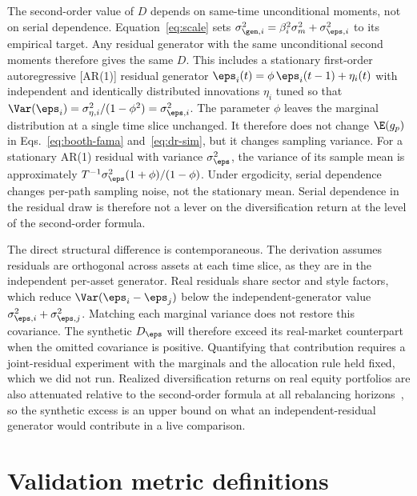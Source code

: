 The second-order value of $D$ depends on same-time unconditional
moments, not on serial dependence. Equation~\eqref{eq:scale} sets
$\sigma_{\gen,i}^2=\beta_i^2\sigma_m^2+\sigma_{\eps,i}^2$ to its
empirical target. Any residual generator with the same unconditional
second moments therefore gives the same $D$. This includes a stationary
first-order autoregressive [AR(1)] residual generator
$\eps_i(t) = \phi\, \eps_i(t-1) + \eta_i(t)$ with independent and
identically distributed innovations $\eta_i$ tuned so that
$\Var(\eps_i) = \sigma_{\eta,i}^2 / (1 - \phi^2) = \sigma_{\eps,i}^2$.
The parameter $\phi$ leaves the marginal distribution at a single
time slice unchanged. It therefore does not change $\E(g_p)$ in
Eqs.~\eqref{eq:booth-fama} and~\eqref{eq:dr-sim}, but it changes
sampling variance. For a stationary AR(1) residual with variance
$\sigma_\eps^2$, the variance of its sample mean is approximately
$T^{-1}\sigma_\eps^2(1+\phi)/(1-\phi)$. Under ergodicity, serial
dependence changes per-path sampling noise, not the stationary mean.
Serial dependence in the residual draw is therefore not a lever on the
diversification return at the level of the second-order formula.

The direct structural difference is contemporaneous. The derivation
assumes residuals are orthogonal across assets at each time slice, as
they are in the independent per-asset generator. Real residuals share
sector and style factors, which reduce $\Var(\eps_i-\eps_j)$ below the
independent-generator value
$\sigma_{\eps,i}^2+\sigma_{\eps,j}^2$. Matching each marginal variance
does not restore this covariance. The synthetic $D_\eps$ will therefore
exceed its real-market counterpart when the omitted covariance is
positive. Quantifying that contribution requires a joint-residual
experiment with the marginals and the allocation rule held fixed,
which we did not run. Realized diversification returns on real equity
portfolios are also attenuated relative to the second-order formula at
all rebalancing horizons~\cite{boucheyNemtchinovWong2015}, so the
synthetic excess is an upper bound on what an independent-residual
generator would contribute in a live comparison.



\section{Validation metric definitions}
\label{sec:supp-validation}

